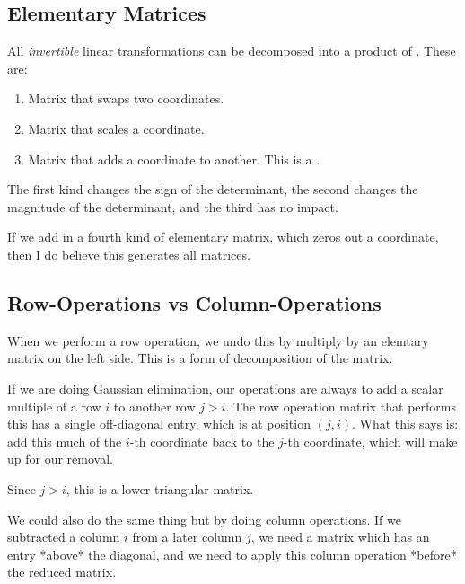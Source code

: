 \subsection{Elementary Matrices}

All \emph{invertible} linear transformations can be decomposed into a
product of . These are:

\begin{enumerate}
  \item Matrix that swaps two coordinates.
  \item Matrix that scales a coordinate.
  \item Matrix that adds a coordinate to another. This is a
  .
\end{enumerate}

The first kind changes the sign of the determinant, the second changes
the magnitude of the determinant, and the third has no impact.

If we add in a fourth kind of elementary matrix, which zeros out a
coordinate, then I do believe this generates all matrices.

\subsection{Row-Operations vs Column-Operations}

When we perform a row operation, we undo this by multiply by an
elemtary matrix on the left side. This is a form of decomposition of
the matrix.

If we are doing Gaussian elimination, our operations are always to add a
scalar multiple of a row $i$ to another row $j>i$. The row operation
matrix that performs this has a single off-diagonal entry, which is at
position $(j, i)$. What this says is: add this much of the $i$-th
coordinate back to the $j$-th coordinate, which will make up for our
removal.

Since $j>i$, this is a lower triangular matrix.

We could also do the same thing but by doing column operations. If we
subtracted a column $i$ from a later column $j$, we need a matrix
which has an entry *above* the diagonal, and we need to apply this
column operation *before* the reduced matrix.
